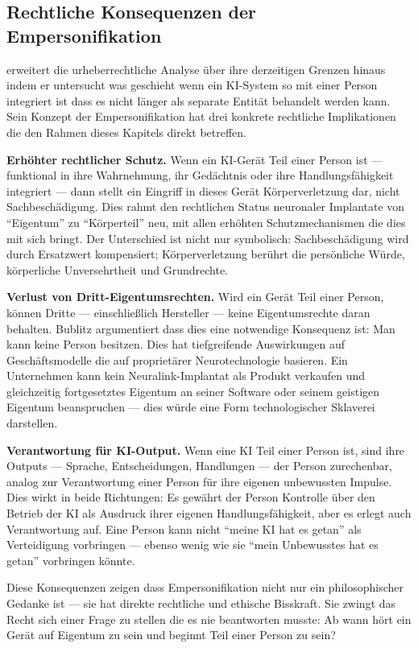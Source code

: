 \documentclass[acmcp, noacm]{acmart}
\begin{document}
\subsection{Rechtliche Konsequenzen der Empersonifikation}

\cite{bublitz2024} erweitert die urheberrechtliche Analyse über ihre derzeitigen Grenzen hinaus indem er untersucht was geschieht wenn ein KI-System so mit einer Person integriert ist dass es nicht länger als separate Entität behandelt werden kann. Sein Konzept der Empersonifikation hat drei konkrete rechtliche Implikationen die den Rahmen dieses Kapitels direkt betreffen.

\textbf{Erhöhter rechtlicher Schutz.} Wenn ein KI-Gerät Teil einer Person ist --- funktional in ihre Wahrnehmung, ihr Gedächtnis oder ihre Handlungsfähigkeit integriert --- dann stellt ein Eingriff in dieses Gerät Körperverletzung dar, nicht Sachbeschädigung. Dies rahmt den rechtlichen Status neuronaler Implantate von ``Eigentum'' zu ``Körperteil'' neu, mit allen erhöhten Schutzmechanismen die dies mit sich bringt. Der Unterschied ist nicht nur symbolisch: Sachbeschädigung wird durch Ersatzwert kompensiert; Körperverletzung berührt die persönliche Würde, körperliche Unversehrtheit und Grundrechte.

\textbf{Verlust von Dritt-Eigentumsrechten.} Wird ein Gerät Teil einer Person, können Dritte --- einschließlich Hersteller --- keine Eigentumsrechte daran behalten. Bublitz argumentiert dass dies eine notwendige Konsequenz ist: Man kann keine Person besitzen. Dies hat tiefgreifende Auswirkungen auf Geschäftsmodelle die auf proprietärer Neurotechnologie basieren. Ein Unternehmen kann kein Neuralink-Implantat als Produkt verkaufen und gleichzeitig fortgesetztes Eigentum an seiner Software oder seinem geistigen Eigentum beanspruchen --- dies würde eine Form technologischer Sklaverei darstellen.

\textbf{Verantwortung für KI-Output.} Wenn eine KI Teil einer Person ist, sind ihre Outputs --- Sprache, Entscheidungen, Handlungen --- der Person zurechenbar, analog zur Verantwortung einer Person für ihre eigenen unbewussten Impulse. Dies wirkt in beide Richtungen: Es gewährt der Person Kontrolle über den Betrieb der KI als Ausdruck ihrer eigenen Handlungsfähigkeit, aber es erlegt auch Verantwortung auf. Eine Person kann nicht ``meine KI hat es getan'' als Verteidigung vorbringen --- ebenso wenig wie sie ``mein Unbewusstes hat es getan'' vorbringen könnte.

Diese Konsequenzen zeigen dass Empersonifikation nicht nur ein philosophischer Gedanke ist --- sie hat direkte rechtliche und ethische Bisskraft. Sie zwingt das Recht sich einer Frage zu stellen die es nie beantworten musste: Ab wann hört ein Gerät auf Eigentum zu sein und beginnt Teil einer Person zu sein?
\end{document}
